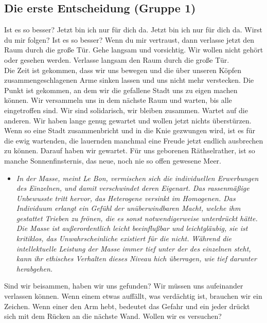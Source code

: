 \documentclass[a4paper, 12pt]{article}
\begin{document}
\subsection{Die erste Entscheidung (Gruppe 1)}
Ist es so besser? Jetzt bin ich nur für dich da.
Jetzt bin ich nur für dich da. Wirst du mir folgen? 
Ist es so besser?
Wenn du mir vertraust, dann verlasse jetzt den Raum durch die große Tür. 
Gehe langsam und vorsichtig. 
Wir wollen nicht gehört oder gesehen werden. 
Verlasse langsam den Raum durch die große Tür.\\
Die Zeit ist gekommen, dass wir uns bewegen und die über unseren Köpfen zusammengeschlagenen Arme sinken lassen und uns nicht mehr verstecken. 
Die Punkt ist gekommen, an dem wir die gefallene Stadt uns zu eigen machen können. 
Wir versammeln uns in dem nächste Raum und warten, bis alle eingetroffen sind.
Wir sind solidarisch, wir bleiben zusammen.
Wartet auf die anderen. Wir haben lange genug gewartet und wollen jetzt nichts überstürzen.
Wenn so eine Stadt zusammenbricht und in die Knie gezwungen wird, ist es für die ewig wartenden, die lauernden manchmal eine Freude jetzt endlich ausbrechen zu können. 
Darauf haben wir gewartet.
Für uns geborenen Räthselrather, ist so manche Sonnenfinsternis, das neue, noch nie so offen gewesene Meer. 
\begin{itemize}

    \item[] \textit{In der Masse, meint Le Bon, vermischen sich die individuellen Erwerbungen des Einzelnen, und damit verschwindet deren Eigenart. 
Das rassenmäßige Unbewusste tritt hervor, das Heterogene versinkt im Homogenen.
Das Individuum erlangt ein Gefühl der unüberwindbaren Macht, welche ihm gestattet Trieben zu frönen, die es sonst notwendigerweise unterdrückt hätte.
Die Masse ist außerordentlich leicht beeinflußbar und leichtgläubig, sie ist kritiklos, das Unwahrscheinliche existiert für die nicht.
Während die intellektuelle Leistung der Masse  immer tief unter der des einzelnen steht, kann ihr ethisches Verhalten dieses Niveau hich überragen, wie tief darunter herabgehen.}
\end{itemize}

Sind wir beisammen, haben wir uns gefunden? 
Wir müssen uns aufeinander verlassen können. 
Wenn einem etwas auffällt, was verdächtig ist, brauchen wir ein Zeichen.
Wenn einer den Arm hebt, bedeutet das Gefahr und ein jeder drückt sich mit dem Rücken an die nächste Wand. 
Wollen wir es versuchen?\\
\end{document}
